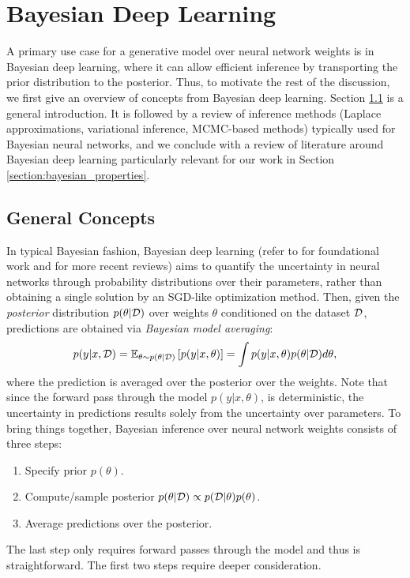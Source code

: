 
\chapter{Bayesian Deep Learning}\label{section:bayesian_dl}

A primary use case for a generative model over neural network weights is in Bayesian deep learning, where it can allow efficient inference by transporting the prior distribution to the posterior. Thus, to motivate the rest of the discussion, we first give an overview of concepts from Bayesian deep learning. Section \ref{section:bayesian_concepts} is a general introduction. It is followed by a review of inference methods (Laplace approximations, variational inference, MCMC-based methods) typically used for Bayesian neural networks, and we conclude with a review of literature around Bayesian deep learning particularly relevant for our work in Section \ref{section:bayesian_properties}.

\section{General Concepts} \label{section:bayesian_concepts}

In typical Bayesian fashion, Bayesian deep learning (refer to \citep{mackayBayesianMethodsAdaptive1992, nealBayesianLearningNeural1996} for foundational work and \citep{goanBayesianNeuralNetworks2020,arbelPrimerBayesianNeural2023} for more recent reviews) aims to quantify the uncertainty in neural networks through probability distributions over their parameters, rather than obtaining a single solution by an SGD-like optimization method. Then, given the \textit{posterior} distribution $p(\theta \vert \mathcal{D})$ over weights $\theta$ conditioned on the dataset $\mathcal{D}$, predictions are obtained via \textit{Bayesian model averaging}:
\begin{equation} \label{eq:model_averaging}
    p(y \vert x, \mathcal{D}) 
    = \mathbb{E}_{\theta \sim p(\theta \vert \mathcal{D})} \left[ p(y\vert x, \theta) \right]
    = \int p(y \vert x, \theta) p(\theta \vert \mathcal{D}) d\theta,
\end{equation}
where the prediction is averaged over the posterior over the weights. Note that since the forward pass through the model $p(y \vert x, \theta)$, is deterministic, the uncertainty in predictions results solely from the uncertainty over parameters. To bring things together, Bayesian inference over neural network weights consists of three steps:
\begin{enumerate}
    \item Specify prior $p(\theta)$.
    \item Compute/sample posterior $p(\theta \vert \mathcal{D}) \propto p(\mathcal{D} \vert \theta) p(\theta)$.
    \item Average predictions over the posterior. 
\end{enumerate}
The last step only requires forward passes through the model and thus is straightforward. The first two steps require deeper consideration. 

